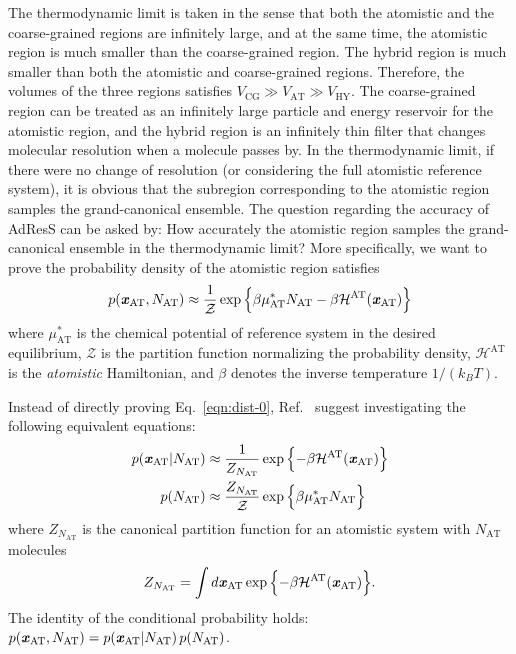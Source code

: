 \documentclass[epjST]{svjour}
\newcommand{\recheck}[1]{{\color{red} #1}}
\newcommand{\vect}[1]{\textbf{\textit{#1}}}
\newcommand{\mh}[0]{\mathcal {H}}
\newcommand{\AT}[0]{\textrm{AT}}
\newcommand{\HY}[0]{\textrm{HY}}
\newcommand{\CG}[0]{\textrm{CG}}
\begin{document}
The thermodynamic limit is taken in the sense that both the atomistic
and the coarse-grained regions are infinitely large, and at the same
time, the atomistic region is much smaller than the coarse-grained
region. The hybrid region is much smaller than both the atomistic and
coarse-grained regions.  Therefore, the volumes of the
three regions satisfies $V_\CG\gg V_\AT\gg V_\HY$.  The coarse-grained
region can be treated as an infinitely large particle and energy
reservoir for the atomistic region, and the hybrid region is an
infinitely thin filter that changes molecular resolution when a
molecule passes by. In the
thermodynamic limit, if there were no change of resolution (or
considering the full atomistic reference system), it is obvious that
the subregion corresponding to the atomistic region samples the
grand-canonical ensemble.  The question regarding the accuracy of
AdResS can be asked by: How accurately the atomistic region samples
the grand-canonical ensemble in the thermodynamic limit? More
specifically, we want to prove the probability density of the atomistic region satisfies
\begin{align}\label{eqn:dist-0}
  p(\vect x_\AT, N_\AT) \approx \frac{1}{\mathcal Z} \exp\Big\{{\beta\mu^\ast_\AT N_\AT - \beta \mh^\AT(\vect x_\AT)} \Big\}
\end{align}
where $\mu^\ast_\AT$ is the chemical potential of reference system in
the desired equilibrium, $\mathcal Z$ is the partition function
normalizing the probability density, $\mh^\AT$ is the \emph{atomistic}
Hamiltonian, \recheck{and $\beta$ denotes the inverse temperature $1/(k_BT)$.}

Instead of directly proving Eq.~\eqref{eqn:dist-0}, Ref.~\cite{wang2013grand}
suggest investigating the following equivalent equations:
\begin{align}\label{eqn:dist-1-0}
  p(\vect x_\AT \vert N_\AT) &\approx \frac{1}{Z_{N_\AT}} \exp\Big\{{- \beta \mh^\AT(\vect x_\AT)}\Big\}  \\\label{eqn:dist-1-1}
  p(N_\AT) & \approx \frac{ Z_{N_\AT}}{\mathcal Z} \exp\Big\{{\beta\mu^\ast_\AT N_\AT}\Big\}
\end{align}
where $Z_{N_\AT}$ is the canonical partition function for an atomistic
system with $N_\AT$ molecules
\begin{align}
  Z_{N_\AT} = \int d\vect x_{\AT} \exp\Big\{{- \beta \mh^\AT(\vect x_\AT)}\Big\}.
\end{align}
The identity of the conditional probability holds: $ p(\vect x_\AT, N_\AT)  = p(\vect x_\AT \vert N_\AT) \, p(N_\AT) $.
\end{document}
